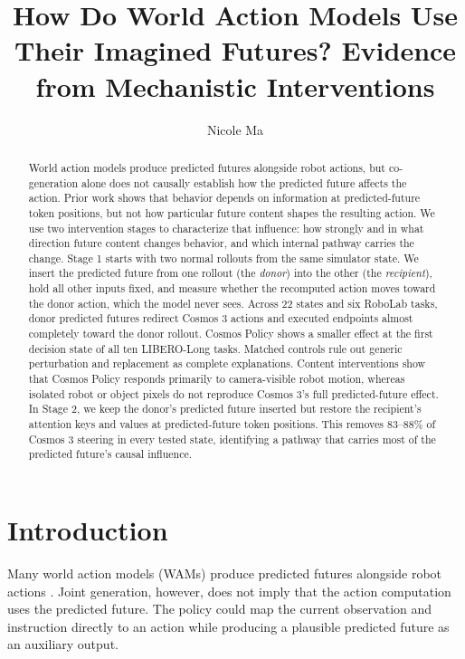 \documentclass{article}
\title{How Do World Action Models Use Their Imagined Futures? Evidence from Mechanistic Interventions}
\author{Nicole Ma}
\begin{document}
\maketitle

\begin{abstract}
World action models produce predicted futures alongside robot actions, but co-generation alone does not causally establish how the predicted future affects the action. Prior work shows that behavior depends on information at predicted-future token positions, but not how particular future content shapes the resulting action. We use two intervention stages to characterize that influence: how strongly and in what direction future content changes behavior, and which internal pathway carries the change. Stage 1 starts with two normal rollouts from the same simulator state. We insert the predicted future from one rollout (the \emph{donor}) into the other (the \emph{recipient}), hold all other inputs fixed, and measure whether the recomputed action moves toward the donor action, which the model never sees. Across 22 states and six RoboLab tasks, donor predicted futures redirect Cosmos 3 actions and executed endpoints almost completely toward the donor rollout. Cosmos Policy shows a smaller effect at the first decision state of all ten LIBERO-Long tasks. Matched controls rule out generic perturbation and replacement as complete explanations. Content interventions show that Cosmos Policy responds primarily to camera-visible robot motion, whereas isolated robot or object pixels do not reproduce Cosmos 3's full predicted-future effect. In Stage 2, we keep the donor's predicted future inserted but restore the recipient's attention keys and values at predicted-future token positions. This removes 83--88\% of Cosmos 3 steering in every tested state, identifying a pathway that carries most of the predicted future's causal influence.
\end{abstract}

\section{Introduction}
\label{sec:introduction}

Many world action models (WAMs) produce predicted futures alongside robot actions \citep{kim2026cosmospolicy,nvidia2026cosmos3}. Joint generation, however, does not imply that the action computation uses the predicted future. The policy could map the current observation and instruction directly to an action while producing a plausible predicted future as an auxiliary output.
\end{document}
